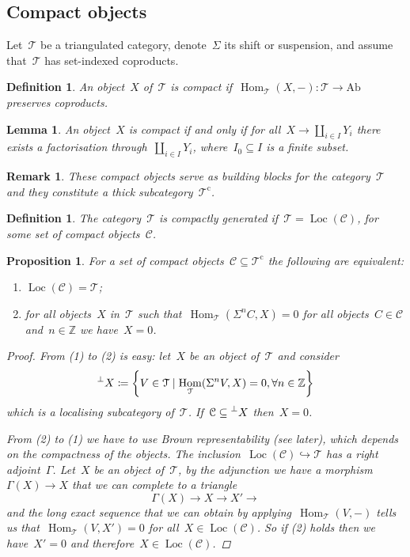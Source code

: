 \documentclass[10pt,a4paper]{article}
\theoremstyle{lecture}
\newtheorem{definition}[theorem]{Definition}
\newtheorem{lemma}[theorem]{Lemma}
\newtheorem{proposition}[theorem]{Proposition}
\newtheorem{remark}[theorem]{Remark}
\newcommand\Ab{\ensuremath{\mathrm{Ab}}}
\newcommand\cc{\ensuremath{\mathrm{c}}}
\DeclareMathOperator\Hom{Hom}
\DeclareMathOperator\Loc{Loc}
\begin{document}
\subsection{Compact objects}
Let~$\mathcal{T}$ be a triangulated category, denote~$\Sigma$ its shift or suspension, and assume that~$\mathcal{T}$ has set-indexed coproducts.
\begin{definition}
  An object~$X$ of~$\mathcal{T}$ is \emph{compact} if~$\Hom_{\mathcal{T}}(X,-)\colon\mathcal{T}\to\Ab$ preserves coproducts.
\end{definition}
\begin{lemma}
  An object~$X$ is compact if and only if for all~$X\to\coprod_{i\in I}Y_i$ there exists a factorisation through~$\coprod_{i\in I}Y_i$, where~$I_0\subseteq I$ is a finite subset.
\end{lemma}
\begin{remark}
  These compact objects serve as building blocks for the category~$\mathcal{T}$ and they constitute a thick subcategory~$\mathcal{T}^\cc$.
\end{remark}
\begin{definition}
  The category~$\mathcal{T}$ is \emph{compactly generated} if~$\mathcal{T}=\Loc(\mathcal{C})$, for some set of compact objects~$\mathcal{C}$.
\end{definition}
\begin{proposition}
  For a set of compact objects~$\mathcal{C}\subseteq\mathcal{T}^\cc$ the following are equivalent:
  \begin{enumerate}
    \item $\Loc(\mathcal{C})=\mathcal{T}$;
    \item for all objects~$X$ in~$\mathcal{T}$ such that~$\Hom_{\mathcal{T}}(\Sigma^nC,X)=0$ for all objects~$C\in\mathcal{C}$ and~$n\in\mathbb{Z}$ we have~$X=0$.
  \end{enumerate}

  \begin{proof}
    From (1) to (2) is easy: let~$X$ be an object of~$\mathcal{T}$ and consider
    \begin{equation}
      \prescript{\perp}{}{X}\coloneqq\left\{ V\in\mathcal{T}\mid\Hom_{\mathcal{T}}(\Sigma^nV,X)=0,\forall n\in\mathbb{Z} \right\}
    \end{equation}
    which is a localising subcategory of~$\mathcal{T}$. If~$\mathcal{C}\subseteq\prescript{\perp}{}{X}$ then~$X=0$.

    From (2) to (1) we have to use Brown representability (see later), which depends on the compactness of the objects. The inclusion~$\Loc(\mathcal{C})\hookrightarrow\mathcal{T}$ has a right adjoint~$\Gamma$. Let~$X$ be an object of~$\mathcal{T}$, by the adjunction we have a morphism~$\Gamma(X)\to X$ that we can complete to a triangle
    \begin{equation}
      \Gamma(X)\to X\to X'\to
    \end{equation}
    and the long exact sequence that we can obtain by applying~$\Hom_{\mathcal{T}}(V,-)$ tells us that~$\Hom_{\mathcal{T}}(V,X')=0$ for all~$X\in\Loc(\mathcal{C})$. So if (2) holds then we have~$X'=0$ and therefore~$X\in\Loc(\mathcal{C})$.%
  \end{proof}
\end{proposition}
\end{document}
